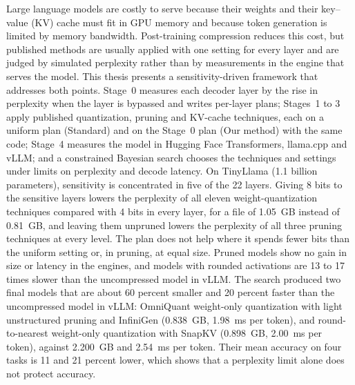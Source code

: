 Large language models are costly to serve because their weights and their key--value (KV) cache must fit in GPU memory and because token generation is limited by memory bandwidth. Post-training compression reduces this cost, but published methods are usually applied with one setting for every layer and are judged by simulated perplexity rather than by measurements in the engine that serves the model. This thesis presents a sensitivity-driven framework that addresses both points. Stage~0 measures each decoder layer by the rise in perplexity when the layer is bypassed and writes per-layer plans; Stages~1 to 3 apply published quantization, pruning and KV-cache techniques, each on a uniform plan (Standard) and on the Stage~0 plan (Our method) with the same code; Stage~4 measures the model in Hugging Face Transformers, llama.cpp and vLLM; and a constrained Bayesian search chooses the techniques and settings under limits on perplexity and decode latency. On TinyLlama (1.1 billion parameters), sensitivity is concentrated in five of the 22 layers. Giving 8 bits to the sensitive layers lowers the perplexity of all eleven weight-quantization techniques compared with 4 bits in every layer, for a file of 1.05~GB instead of 0.81~GB, and leaving them unpruned lowers the perplexity of all three pruning techniques at every level. The plan does not help where it spends fewer bits than the uniform setting or, in pruning, at equal size. Pruned models show no gain in size or latency in the engines, and models with rounded activations are 13 to 17 times slower than the uncompressed model in vLLM. The search produced two final models that are about 60 percent smaller and 20 percent faster than the uncompressed model in vLLM: OmniQuant weight-only quantization with light unstructured pruning and InfiniGen (0.838~GB, 1.98~ms per token), and round-to-nearest weight-only quantization with SnapKV (0.898~GB, 2.00~ms per token), against 2.200~GB and 2.54~ms per token. Their mean accuracy on four tasks is 11 and 21 percent lower, which shows that a perplexity limit alone does not protect accuracy.
